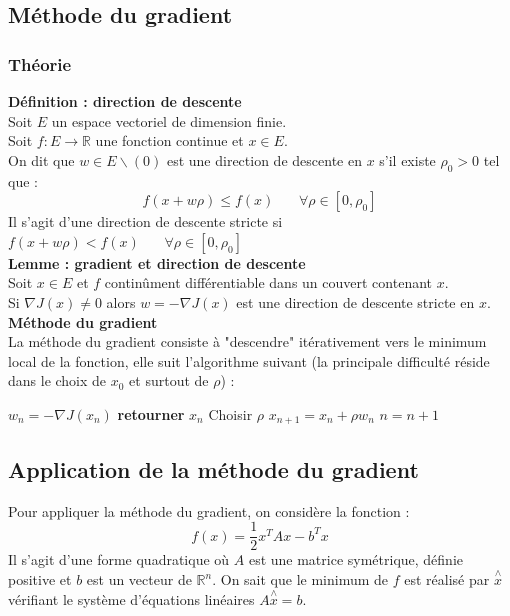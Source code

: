 \documentclass[a4paper,10pt]{report}
\begin{document}
\newpage
\subsection{Méthode du gradient}
\subsubsection{Théorie}
\textbf{Définition : direction de descente}\\
Soit $E$ un espace vectoriel de dimension finie.\\
Soit $f:E \longrightarrow \mathbb{R}$ une fonction continue et $x \in E$.\\
On dit que $w \in E\backslash (0)$ est une direction de descente en $x$ s'il existe $\rho_0>0$ tel que :\\
\abovedisplayskip=0mm
\begin{displaymath}
f(x+w\rho)\leq f(x) \ \ \ \ \ \ \ \ \forall \rho \in [0,\rho_0]
\end{displaymath}
Il s'agit d'une direction de descente stricte si $f(x+w\rho)< f(x) \ \ \ \ \ \ \ \ \forall \rho \in [0,\rho_0]$ \\

\textbf{Lemme : gradient et direction de descente}\\
Soit $x \in E$ et $f$ continûment différentiable dans un couvert contenant $x$.\\
Si $\nabla J(x) \neq 0$ alors $w = - \nabla J(x)$ est une direction de descente stricte en $x$.\\

\textbf{Méthode du gradient}\\
La méthode du gradient consiste à "descendre" itérativement vers le minimum local de la fonction, elle suit l'algorithme suivant (la principale difficulté réside dans le choix de $x_0$ et surtout de $\rho$) :\\

\begin{algorithm}
\begin{algorithmic}
\REPEAT
\STATE $w_n= - \nabla J(x_n)$
\STATE \textbf{retourner } $x_n$
\ELSE
\STATE Choisir $\rho$
\STATE $x_{n+1}=x_n+\rho w_n$
\ENDIF
\STATE $n=n+1$
\end{algorithmic}
\end{algorithm}

\subsection{Application de la méthode du gradient}
Pour appliquer la méthode du gradient, on considère la fonction :\\
\abovedisplayskip=0mm
\begin{displaymath}
f(x) = \frac{1}{2}x^TAx - b^Tx
\end{displaymath}
Il s'agit d'une forme quadratique où $A$ est une matrice symétrique, définie positive et $b$ est un vecteur de $\mathbb{R}^n$. On sait que le minimum de $f$ est réalisé par $\overset{\wedge}{x}$ vérifiant le système d'équations linéaires $A\overset{\wedge}{x}=b$. \\
\end{document}
